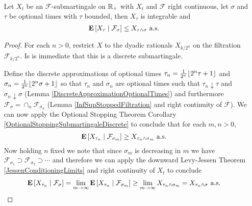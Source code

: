 \begin{thm}\label{OptionalStoppingContinuous}Let $X_t$ be an $\mathcal{F}$-submartingale on $\reals_+$
  with $X_t$ and $\mathcal{F}$ right continuous, let $\sigma$ and
  $\tau$ be optional times with $\tau$ bounded, then $X_\tau$ is
  integrable and
\begin{align*}
\cexpectationlong{\mathcal{F}_\sigma}{X_\tau} &\leq X_{\tau \wedge
  \sigma} \text{ a.s.}
\end{align*}
\end{thm}
\begin{proof}
For each $n>0$, restrict $X$ to the dyadic rationals $X_{k/2^n}$ on the
filtration $\mathcal{F}_{k/2^n}$.  Is is immediate that this is a
discrete submartingale.

Define the discrete approximations of optional times $\tau_n =
\frac{1}{2^n} \floor{2^n \tau + 1}$ and $\sigma_n = \frac{1}{2^n}
\floor{2^n \sigma + 1}$ so that $\tau_n$ and $\sigma_n$ are optional
times such that $\tau_n \downarrow \tau$ and $\sigma_n \downarrow
\sigma$ (Lemma \ref{DiscreteApproximationOptionalTimes}) and
furthermore $\mathcal{F}_\sigma = \cap_n \mathcal{F}_{\sigma_n}$ (Lemma
\ref{InfSupStoppedFiltration} and right
continuity of $\mathcal{F}$).
We can now apply the Optional Stopping Theorem Corollary
\ref{OptionalStoppingSubmartingaleDiscrete} to conclude that for each
$m,n>0$,
\begin{align*}
\cexpectationlong{\mathcal{F}_{\sigma_m}}{X_{\tau_n}} &\geq X_{\tau_n \wedge
  \sigma_m} \text{ a.s.}
\end{align*}
Now holding $n$ fixed we note that since $\sigma_m$ is decreasing in
$m$ we have $\mathcal{F}_{\sigma_1} \supset
\mathcal{F}_{\sigma_{2}} \supset \cdots$ and therefore we can apply
the downward Levy-Jessen Theorem \ref {JessenConditioningLimits} and
right continuity of $X_t$ to
conclude 
\begin{align*}
\cexpectationlong{\mathcal{F}_{\sigma}}{X_{\tau_n}} &=\lim_{m \to
  \infty} \cexpectationlong{\mathcal{F}_{\sigma_m}}{X_{\tau_n}}  \geq
\lim_{m \to \infty} X_{\tau_n \wedge  \sigma_m} 
= X_{\tau_n \wedge \sigma} \text{ a.s.}
\end{align*}


\end{proof}
